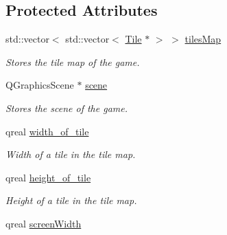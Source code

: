\subsection*{Protected Attributes}
\begin{DoxyCompactItemize}
\item 
\hypertarget{classPhysicsComponent_aa1d5e5b95523225244e36df0f7490465}{std\-::vector$<$ std\-::vector$<$ \hyperlink{classTile}{Tile} $\ast$ $>$ $>$ \hyperlink{classPhysicsComponent_aa1d5e5b95523225244e36df0f7490465}{tiles\-Map}}\label{classPhysicsComponent_aa1d5e5b95523225244e36df0f7490465}

\begin{DoxyCompactList}\small\item\em Stores the tile map of the game. \end{DoxyCompactList}\item 
\hypertarget{classPhysicsComponent_a838b5b49b38cfaf7a1a4b4ab2ff6accd}{Q\-Graphics\-Scene $\ast$ \hyperlink{classPhysicsComponent_a838b5b49b38cfaf7a1a4b4ab2ff6accd}{scene}}\label{classPhysicsComponent_a838b5b49b38cfaf7a1a4b4ab2ff6accd}

\begin{DoxyCompactList}\small\item\em Stores the scene of the game. \end{DoxyCompactList}\item 
\hypertarget{classPhysicsComponent_aafd178b1852f4907462b02236675bc8e}{qreal \hyperlink{classPhysicsComponent_aafd178b1852f4907462b02236675bc8e}{width\-\_\-of\-\_\-tile}}\label{classPhysicsComponent_aafd178b1852f4907462b02236675bc8e}

\begin{DoxyCompactList}\small\item\em Width of a tile in the tile map. \end{DoxyCompactList}\item 
\hypertarget{classPhysicsComponent_af2fccaddf29b9d7beb69e90877d3f6b1}{qreal \hyperlink{classPhysicsComponent_af2fccaddf29b9d7beb69e90877d3f6b1}{height\-\_\-of\-\_\-tile}}\label{classPhysicsComponent_af2fccaddf29b9d7beb69e90877d3f6b1}

\begin{DoxyCompactList}\small\item\em Height of a tile in the tile map. \end{DoxyCompactList}\item 
\hypertarget{classPhysicsComponent_abb107c2629e5fa404b0ec29517ead1fe}{qreal \hyperlink{classPhysicsComponent_abb107c2629e5fa404b0ec29517ead1fe}{screen\-Width}}\label{classPhysicsComponent_abb107c2629e5fa404b0ec29517ead1fe}


\end{DoxyCompactItemize}
